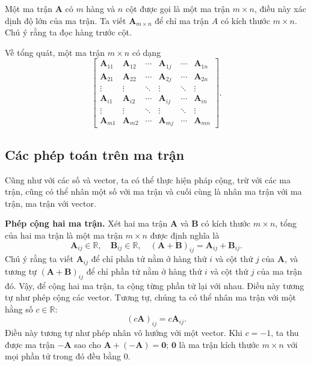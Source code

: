 Một ma trận \(\mathbf{A}\) có \(m\) hàng và \(n\) cột được gọi là một ma trận \(m\times n\), điều này xác dịnh độ lớn của ma trận. Ta viết \(\mathbf{A}_{m\times n}\) để chỉ ma trận \(A\) có kích thước \(m\times n\). Chú ý rằng ta đọc hàng trước cột. 
\vspace{8pt}

Về tổng quát, một ma trận \(m\times n\) có dạng
\[\begin{bmatrix}
    \mathbf{A}_{11} &   \mathbf{A}_{12} &\cdots &\mathbf{A}_{1j} &\cdots      & \mathbf{A}_{1n}\\  
    \mathbf{A}_{21} &   \mathbf{A}_{22} &\cdots &\mathbf{A}_{2j} &\cdots      & \mathbf{A}_{2n}\\
    \vdots          &   \vdots          &\ddots &\vdots          &\ddots      & \vdots         \\
    \mathbf{A}_{i1} &   \mathbf{A}_{i2} &\cdots &\mathbf{A}_{ij} &\cdots      & \mathbf{A}_{in}\\
    \vdots          &   \vdots          &\ddots &\vdots          &\ddots      &\vdots          \\
    \mathbf{A}_{m1} &   \mathbf{A}_{m2} &\cdots &\mathbf{A}_{mj} &\cdots      & \mathbf{A}_{mn}              
\end{bmatrix}.\]
\subsection{Các phép toán trên ma trận}
Cũng như với các số và vector, ta có thể thực hiện pháp cộng, trừ với các ma trận, cũng có thể nhân một số với ma trận và cuối cùng là nhân ma trận với ma trận, ma trận với vector. 
\vspace{8pt}

\textbf{Phép cộng hai ma trận.} Xét hai ma trận \(\mathbf{A}\) và \(\mathbf{B}\) có kích thước \(m\times n\), tổng của hai ma trận là một ma trận \(m\times n\) được định nghĩa là 
\begin{equation}
   \mathbf{A}_{ij}\in\mathbb{R},\quad \mathbf{B}_{ij}\in\mathbb{R},\quad 
    (\mathbf{A}+\mathbf{B})_{ij}=\mathbf{A}_{ij}+\mathbf{B}_{ij}.
\end{equation}
Chú ý rằng ta viết \(\mathbf{A}_{ij}\) để chỉ phần tử nằm ở hàng thứ \(i\) và cột thứ \(j\) của \(\mathbf{A}\), và tương tự \((\mathbf{A+B})_{ij}\) để chỉ phần tử nằm ở hàng thứ \(i\) và cột thứ \(j\) của ma trận đó. Vậy, để cộng hai ma trận, ta cộng từng phần tử lại với nhau. Điều này tương tự như phép cộng các vector.
Tương tự, chúng ta có thể nhân ma trận với một hằng số \(c\in\mathbb{R}\):
\begin{equation}
    (c\mathbf{A})_{ij}=c\mathbf{A}_{ij}.
\end{equation}
Điều này tương tự như phép nhân vô hướng với một vector. Khi \(c=-1\), ta thu được ma trận \(-\mathbf{A}\) sao cho \(\mathbf{A}+(-\mathbf{A})=\mathbf{0}\); \(\mathbf{0}\) là ma trận kích thước \(m\times n\) với mọi phần tử trong đó đều bằng \(0\).
\vspace{8pt}

